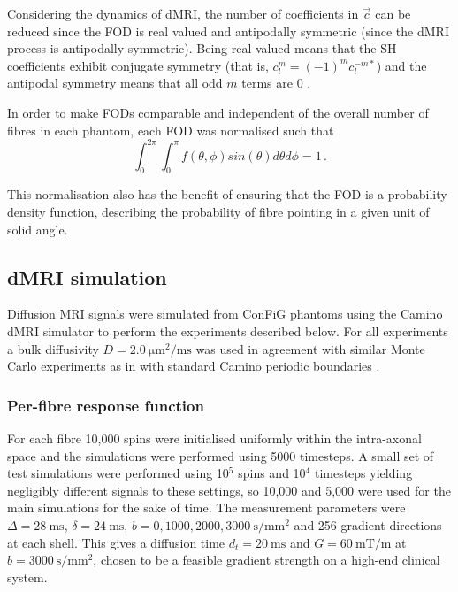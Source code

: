 Considering the dynamics of \ac{dMRI}, the number of coefficients in $\vec{c}$ can be reduced since the \ac{FOD} is real valued and antipodally symmetric (since the \ac{dMRI} process is antipodally symmetric).
Being real valued means that the \ac{SH} coefficients exhibit conjugate symmetry (that is, $c_l^m = (-1)^mc_l^{-m*}$) \cite{Tournier2004,Alexander2002} and the antipodal symmetry means that all odd $m$ terms are 0 \cite{Alexander2002,Tournier2004}.

In order to make \acp{FOD} comparable and independent of the overall number of fibres in each phantom, each \ac{FOD} was normalised such that
\begin{equation}
  \int_0^{2\pi} \int_0^\pi f(\theta, \phi) sin(\theta) d\theta d\phi = 1\,.
  \label{frf:fod_normalisation}
\end{equation}

This normalisation also has the benefit of ensuring that the \ac{FOD} is a probability density function, describing the probability of fibre pointing in a given unit of solid angle. 



\subsection{dMRI simulation}
\label{sec:frf_dMRI_simulation}
Diffusion MRI signals were simulated from ConFiG phantoms using the Camino \ac{dMRI} simulator \cite{Cook2006,Hall2009} to perform the experiments described below. For all experiments a bulk diffusivity $D = \SI{2.0}{\micro\metre\squared\per\milli\second}$ was used in agreement with similar Monte Carlo experiments as in  with standard Camino periodic boundaries \cite{Panagiotaki2010}.


\subsubsection{Per-fibre response function}
For each fibre 10,000 spins were initialised uniformly within the intra-axonal space and the simulations were performed using 5000 timesteps. A small set of test simulations were performed using 10$^5$ spins and 10$^4$ timesteps yielding negligibly different signals to these settings, so 10,000 and 5,000 were used for the main simulations for the sake of time. The measurement parameters were $\Delta = \SI{28}{\milli\second}$, $\delta = \SI{24}{\milli\second}$, $b = 0,1000,2000,\SI{3000}{\second\per\milli\metre\squared}$ and 256 gradient directions at each shell. This gives a diffusion time $d_t = \SI{20}{\milli\second}$ and $G = \SI{60}{\milli\tesla\per\metre}$ at $b = \SI{3000}{\second\per\milli\metre\squared}$, chosen to be a feasible gradient strength on a high-end clinical system.

